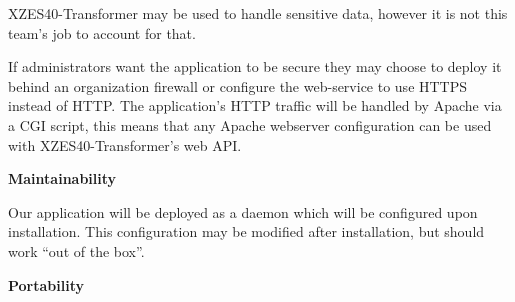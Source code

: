XZES40-Transformer may be used to handle sensitive data, however it is not this team's job to account for that.

If administrators want the application to be secure they may choose to deploy it behind an organization firewall or configure the web-service to use HTTPS instead of HTTP.
The application's HTTP traffic will be handled by Apache via a CGI script, this means that any Apache webserver configuration can be used with XZES40-Transformer's web API.


\textbf{Maintainability}

Our application will be deployed as a daemon which will be configured upon installation.
This configuration may be modified after installation, but should work ``out of the box''.


\textbf{Portability}

